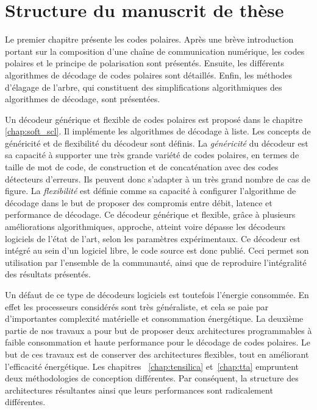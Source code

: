 \section*{Structure du manuscrit de thèse}

Le premier chapitre présente les codes polaires. Après une brève introduction portant sur la composition d'une chaîne de communication numérique, les codes polaires et le principe de polarisation sont présentés. Ensuite, les différents algorithmes de décodage de codes polaires sont détaillés. Enfin, les méthodes d'élagage de l'arbre, qui constituent des simplifications algorithmiques des algorithmes de décodage, sont présentées.

Un décodeur générique et flexible de codes polaires est proposé dans le chapitre \ref{chap:soft_scl}. Il implémente les algorithmes de décodage à liste. Les concepts de généricité et de flexibilité du décodeur sont définis. La \textit{généricité} du décodeur est sa capacité à supporter une très grande variété de codes polaires, en termes de taille de mot de code, de construction et de concaténation avec des codes détecteurs d'erreurs. Ils peuvent donc s'adapter à un très grand nombre de cas de figure. La \textit{flexibilité} est définie comme sa capacité à configurer l'algorithme de décodage dans le but de proposer des compromis entre débit, latence et performance de décodage. Ce décodeur générique et flexible, grâce à plusieurs améliorations algorithmiques, approche, atteint voire dépasse les décodeurs logiciels de l'état de l'art, selon les paramètres expérimentaux. Ce décodeur est intégré au sein d'un logiciel libre, le code source est donc publié. Ceci permet son utilisation par l'ensemble de la communauté, ainsi que de reproduire l'intégralité des résultats présentés.

Un défaut de ce type de décodeurs logiciels est toutefois l'énergie consommée. En effet les processeurs considérés sont très généraliste, et cela se paie par d'importantes complexité matérielle et consommation énergétique. La deuxième partie de nos travaux a pour but de proposer deux architectures programmables à faible consommation et haute performance pour le décodage de codes polaires. Le but de ces travaux est de conserver des architectures flexibles, tout en améliorant l'efficacité énergétique. Les chapitres ~\ref{chap:tensilica} et~\ref{chap:tta} empruntent deux méthodologies de conception différentes. Par conséquent, la structure des architectures résultantes ainsi que leurs performances sont radicalement différentes.


